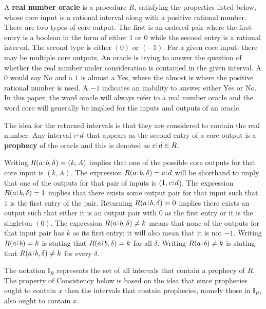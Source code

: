 \documentclass[12pt]{article}
\begin{document}
A \textbf{real number oracle} is a procedure $R$, satisfying the properties listed below, whose core input is a rational interval along with a positive rational number. There are two types of core output. The first is an ordered pair where the first entry is a boolean in the form of either $1$ or $0$ while the second entry is a rational interval. The second type is either $(0)$ or $(-1)$. For a given core input, there may be multiple core outputs. An oracle is trying to answer the question of whether the real number under consideration is contained in the given interval. A $0$ would say No and a $1$ is almost a Yes, where the almost is where the positive rational number is used. A $-1$ indicates an inability to answer either Yes or No. In this paper, the word oracle will always refer to a real number oracle and the word core will generally be implied for the inputs and outputs of an oracle.


The idea for the returned intervals is that they are considered to contain the real number. Any interval $c\rint d$ that appears as the second entry of a core output is a \textbf{prophecy} of the oracle and this is denoted as $c\rint d \in R$. 

Writing $R(a\rint b, \delta)=(k ,A)$ implies that one of the possible core outputs for that core input is $(k, A)$. The expression $R(a\rint b, \delta) = c\rint d$ will be shorthand to imply that one of the outputs for that pair of inputs is $(1, c\rint d$).  The expression $R(a \rint b, \delta) = 1$ implies that there exists some output pair for that input such that $1$ is the first entry of the pair. Returning $R(a\rint b, \delta) = 0$ implies there exists an output such that either it is an output pair with $0$ as the first entry or it is the singleton $(0)$. The expression $R(a\rint b, \delta) \neq k$ means that none of the outputs for that input pair has $k$ as its first entry; it will also mean that it is not $-1$.  Writing $R(a \rint b) = k$ is stating that $R(a \rint b, \delta) = k$ for all $\delta$.  Writing $R(a \rint b) \neq k$ is stating that  $R(a\rint b, \delta) \neq k$ for every $\delta$. 

The notation $\mathbb{I}_R$ represents the set of all intervals that contain a prophecy of $R$. The property of Consistency below is based on the idea that since prophecies ought to contain $x$ then the intervals that contain prophecies, namely those in $\mathbb{I}_R$,  also ought to contain $x$. 
\end{document}
